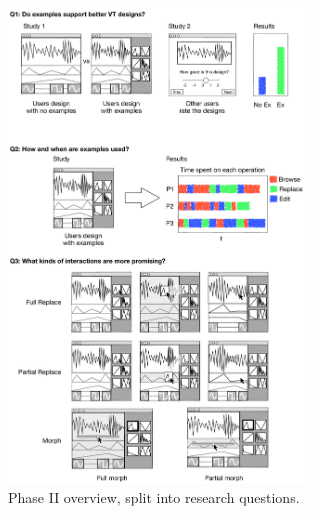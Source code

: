 \begin{figure}[htbp]
\begin{center}
\includegraphics[width=0.7\textwidth, height=0.9\textheight]{DesignGalleryQuestions}

\caption{Phase II overview, split into research questions.}
\label{fig:macaron:phaseII:overview}
\end{center}
\end{figure}



%



\endinput
